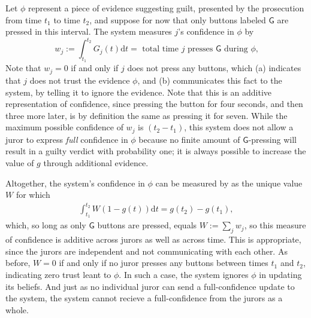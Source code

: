 \begin{subappendices}
\begin{example}
    Let $\phi$ represent a piece of evidence suggesting guilt, presented by the
    prosecution from time $t_1$ to time $t_2$,
    and suppose for now that only buttons labeled $\mathsf G$ are pressed
    in this interval.
    The system measures $j$'s confidence in $\phi$ by
    \[
    	w_j := \!\int_{t_1}^{t_2}\!\! G_j(t) \mathrm d t 
    	= \text{ total time $j$ presses $\mathsf G$ during $\phi$,}
    \]
    Note that $w_j = 0$ if and only if $j$ does not press any buttons,
    which (a) indicates that $j$ does not trust the evidence $\phi$, 
    and (b) communicates this fact to the system, by telling it to ignore 
    the evidence. 
    Note that this is an additive representation of confidence, since
    pressing the button for four seconds, and then three more later, is
    by definition the same as pressing it for seven. 
    While the maximum possible confidence of $w_j$ is $(t_2 - t_1)$,
    this system does not allow a juror to express \emph{full} confidence in $\phi$
    because no finite amount of $\mathsf G$-pressing will result in a 
    guilty verdict with probability one; it is always possible to increase
    the value of $g$ through additional evidence. 

    Altogether, the system's confidence in $\phi$ can be measured by
    as the unique value $W$ for which
    \begin{align*}
    	\int_{t_1}^{t_2} W (1-g(t)) \mathrm d t =
    	 g(t_2) - g(t_1),
    \end{align*}
    which, so long as only $\mathsf G$ buttons are pressed, equals
    $W := \sum_{j} w_j$, so this measure of confidence is additive 
    across jurors as well as across time. 
    This is appropriate, since the jurors are independent and 
    not communicating with each other.
    As before, $W = 0$ if and only if no juror presses any buttons between times $t_1$ and $t_2$,
    indicating zero trust leant to $\phi$. In such a case, the system ignores $\phi$ in updating its beliefs.
    And just as no individual juror can send a full-confidence update to the system,
    	the system cannot recieve a full-confidence from the jurors as a whole.
    	

\end{example}
\end{subappendices}
